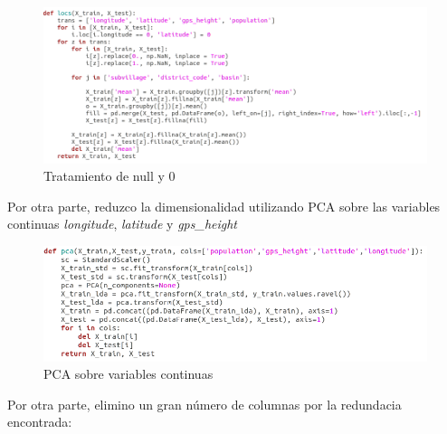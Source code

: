  \begin{figure}[H] %
 	\centering
 	\includegraphics[scale=0.42]{locs1.png}  %
 	\caption{Tratamiento de null y 0} 
 	\label{fig:locs1}
 \end{figure}

Por otra parte, reduzco la dimensionalidad utilizando PCA sobre las variables continuas \textit{longitude}, \textit{latitude} y \textit{gps\_height}

 \begin{figure}[H] %
	\centering
	\includegraphics[scale=0.45]{pca1.png}  %
	\caption{PCA sobre variables continuas} 
	\label{fig:pca1}
\end{figure}

Por otra parte, elimino un gran número de columnas por la redundacia encontrada:

